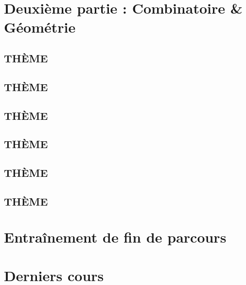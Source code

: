 \documentclass[poly,trombi]{valbonne}
\begin{document}

\section{Deuxième partie : Combinatoire \& Géométrie}

\subsection{THÈME}


\subsection{THÈME}


\subsection{THÈME}


\subsection{THÈME}


\subsection{THÈME}


\subsection{THÈME}


\section{Entraînement de fin de parcours}


\section{Derniers cours}
\end{document}
